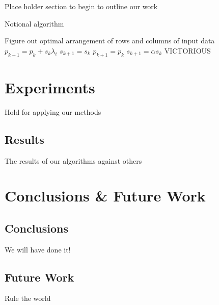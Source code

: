 \documentclass{article}
\begin{document}
Place holder section to begin to outline our work

\begin{algorithm}
  \caption{Notional algorithm}
  \label{alg:compass}
\begin{algorithmic}
  \STATE  Figure out optimal arrangement of rows and columns of input data
  \STATE $p_{k+1} = p_k + s_k\lambda_i$
  \STATE $s_{k+1} = s_k$
  \ELSE
  \STATE $p_{k+1} = p_{k}$
  \STATE $s_{k+1} = \alpha s_k$
  \ENDIF
  \ENDWHILE
  \RETURN VICTORIOUS
\end{algorithmic}
\end{algorithm}

\section{Experiments} \label{experiments}

Hold for applying our methods

\subsection{Results} \label{results}

The results of our algorithms against others

\section{Conclusions \& Future Work}
\subsection{Conclusions}
We will have done it!
 
\subsection{Future Work}
Rule the world 



\end{document}
